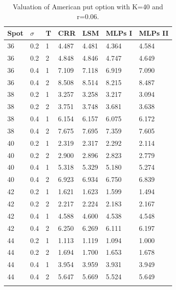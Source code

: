 \begin{table}[th]
\caption{Valuation of American put option with K=40 and r=0.06.}
\label{tab:AmericanPut}
\centering
\begin{tabular}{l l l l l l l }
\toprule
\textbf{Spot} & \textbf{$\sigma$} & \textbf{T} & \textbf{CRR} & \textbf{LSM} & \textbf{MLPs I} & \textbf{MLPs II} \\
\midrule
36 & 0.2 & 1 & 4.487 & 4.481 & 4.364 & 4.584\\
36 & 0.2 & 2 & 4.848 & 4.846 & 4.747 & 4.649\\
36 & 0.4 & 1 & 7.109 & 7.118 & 6.919 & 7.090\\
36 & 0.4 & 2 & 8.508 & 8.514 & 8.215 & 8.487\\
38 & 0.2 & 1 & 3.257 & 3.258 & 3.217 & 3.094\\
38 & 0.2 & 2 & 3.751 & 3.748 & 3.681 & 3.638\\
38 & 0.4 & 1 & 6.154 & 6.157 & 6.075 & 6.172\\
38 & 0.4 & 2 & 7.675 & 7.695 & 7.359 & 7.605\\
40 & 0.2 & 1 & 2.319 & 2.317 & 2.292 & 2.114\\
40 & 0.2 & 2 & 2.900 & 2.896 & 2.823 & 2.779\\
40 & 0.4 & 1 & 5.318 & 5.329 & 5.180 & 5.274\\
40 & 0.4 & 2 & 6.923 & 6.934 & 6.750 & 6.839\\
42 & 0.2 & 1 & 1.621 & 1.623 & 1.599 & 1.494\\
42 & 0.2 & 2 & 2.217 & 2.224 & 2.183 & 2.167\\
42 & 0.4 & 1 & 4.588 & 4.600 & 4.538 & 4.548\\
42 & 0.4 & 2 & 6.250 & 6.269 & 6.111 & 6.197\\
44 & 0.2 & 1 & 1.113 & 1.119 & 1.094 & 1.000\\
44 & 0.2 & 2 & 1.694 & 1.700 & 1.653 & 1.678\\
44 & 0.4 & 1 & 3.954 & 3.959 & 3.931 & 3.949\\
44 & 0.4 & 2 & 5.647 & 5.669 & 5.524 & 5.649\\
\bottomrule\\
\end{tabular}
\end{table}

